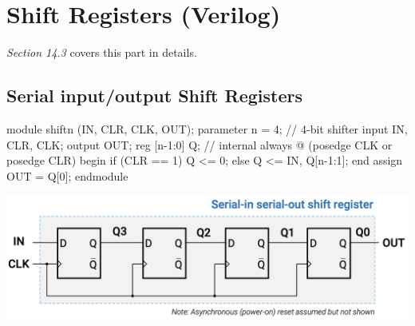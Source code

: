 \documentclass[12pt,openany]{book}
\begin{document}
\section{Shift Registers (Verilog)}
\vspace*{-10px}
\textit{Section 14.3} covers this part in details.
\subsection{Serial input/output Shift Registers}
\begin{minipage}{0.4\textwidth}
	\begin{vhdl}
module shiftn (IN, CLR, CLK, OUT);
	parameter n = 4; // 4-bit shifter
	input IN, CLR, CLK;
	output OUT;
	reg [n-1:0] Q; // internal
	always @ (posedge CLK or posedge CLR)
		begin
			if (CLR == 1) Q <= 0;
			else Q <= {IN, Q[n-1:1]};
		end
	assign OUT = Q[0];
endmodule
	\end{vhdl}
\end{minipage}
\hfill
\hspace*{-4em}
\vline
\hfill
\hspace*{-8em}
\begin{minipage}{0.3\textwidth}
\includegraphics[width=1.3\textwidth]{circuits/14.1.2.png}
\end{minipage}
\end{document}
